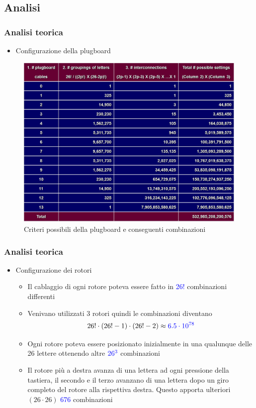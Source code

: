 	\subsection{Analisi}
	
	\begin{frame}
		\frametitle{Analisi teorica}
		\begin{itemize}
			\item Configurazione della plugboard
		\end{itemize}
		\begin{figure}[h]
			\centering
			\includegraphics[scale=0.30]{img/plugboardsettings}
			\caption{Criteri possibili della plugboard e conseguenti combinazioni}
			\label{fig:plugboardsettings}
		\end{figure}		
	\end{frame}
	
	\begin{frame}
		\frametitle{Analisi teorica}
		\begin{itemize}
			\item Configurazione dei rotori
			\begin{itemize}
				\item Il cablaggio di ogni rotore poteva essere fatto in \textcolor{blue}{26!} combinazioni differenti
				\item Venivano utilizzati 3 rotori quindi le combinazioni diventano $$26!\cdot(26!-1)\cdot(26!-2)\approx \textcolor{blue}{6.5 \cdot 10^{78}}$$
				\item Ogni rotore poteva essere posizionato inizialmente in una qualunque delle 26 lettere ottenendo altre $\textcolor{blue}{26^3}$ combinazioni
				\item Il rotore più a destra avanza di una lettera ad ogni pressione della tastiera, il secondo e il terzo avanzano di una lettera dopo un giro completo del rotore alla rispettiva destra. Questo apporta ulteriori $(26 \cdot 26)$ \textcolor{blue}{676} combinazioni
			\end{itemize}
		\end{itemize}
	\end{frame}
	
